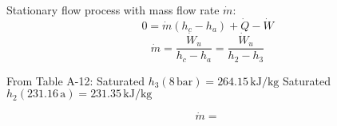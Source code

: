 Stationary flow process with mass flow rate \( \dot{m} \):  
\[ 0 = \dot{m} (h_c - h_a) + \dot{Q} - \dot{W} \]  
\[ \dot{m} = \frac{\dot{W}_u}{h_c - h_a} = \frac{\dot{W}_u}{h_2 - h_3} \]  

From Table A-12:  
Saturated \( h_3 (8 \, \text{bar}) = 264.15 \, \text{kJ/kg} \)  
Saturated \( h_2 (231.16 \, \text{a}) = 231.35 \, \text{kJ/kg} \)  

\[ \dot{m} = \]